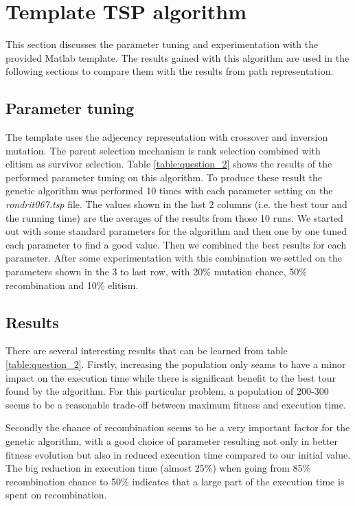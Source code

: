 

\section{Template TSP algorithm}

This section discusses the parameter tuning and experimentation with the provided Matlab template. The results gained with this algorithm are used in the following sections to compare them with the results from path representation.

\subsection{Parameter tuning}
 The template uses the adjecency representation with crossover and inversion mutation. The parent selection mechanism is rank selection combined with elitism as survivor selection. Table \ref{table:question_2} shows the results of the performed parameter tuning on this algorithm. To produce these result the genetic algorithm was performed 10 times with each parameter setting on the \emph{rondrit067.tsp} file. The values shown in the last 2 columns (i.e. the best tour and the running time) are the averages of the results from those 10 runs. We started out with some standard parameters for the algorithm and then one by one tuned each parameter to find a good value. Then we combined the best results for each parameter. After some experimentation with this combination we settled on the parameters shown in the 3 to last row, with 20\% mutation chance, 50\% recombination and 10\% elitism.
 
\subsection{Results}
There are several interesting results that can be learned from table \ref{table:question_2}. Firstly, increasing the population only seams to have a minor impact on the execution time while there is significant benefit to the best tour found by the algorithm. For this particular problem, a population of 200-300 seems to be a reasonable trade-off between maximum fitness and execution time.

Secondly the chance of recombination seems to be a very important factor for the genetic algorithm, with a good choice of parameter resulting not only in better fitness evolution but also in reduced execution time compared to our initial value. The big reduction in execution time (almost 25\%) when going from 85\% recombination chance to 50\% indicates that a large part of the execution time is spent on recombination.

